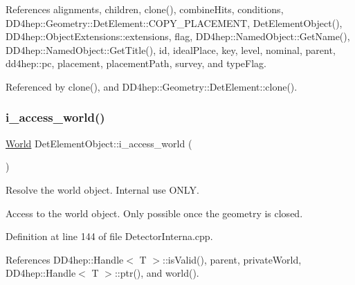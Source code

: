 References alignments, children, clone(), combine\+Hits, conditions, D\+D4hep\+::\+Geometry\+::\+Det\+Element\+::\+C\+O\+P\+Y\+\_\+\+P\+L\+A\+C\+E\+M\+E\+NT, Det\+Element\+Object(), D\+D4hep\+::\+Object\+Extensions\+::extensions, flag, D\+D4hep\+::\+Named\+Object\+::\+Get\+Name(), D\+D4hep\+::\+Named\+Object\+::\+Get\+Title(), id, ideal\+Place, key, level, nominal, parent, dd4hep\+::pc, placement, placement\+Path, survey, and type\+Flag.



Referenced by clone(), and D\+D4hep\+::\+Geometry\+::\+Det\+Element\+::clone().

\hypertarget{class_d_d4hep_1_1_geometry_1_1_det_element_object_af8e12445511be14deaedd157bd8ddbd6}{}\label{class_d_d4hep_1_1_geometry_1_1_det_element_object_af8e12445511be14deaedd157bd8ddbd6} 
\subsubsection{\texorpdfstring{i\+\_\+access\+\_\+world()}{i\_access\_world()}}
{\footnotesize\ttfamily \hyperlink{class_d_d4hep_1_1_geometry_1_1_world}{World} Det\+Element\+Object\+::i\+\_\+access\+\_\+world (\begin{DoxyParamCaption}{ }\end{DoxyParamCaption})\hspace{0.3cm}{\ttfamily [private]}}



Resolve the world object. Internal use O\+N\+LY. 

Access to the world object. Only possible once the geometry is closed. 

Definition at line 144 of file Detector\+Interna.\+cpp.



References D\+D4hep\+::\+Handle$<$ T $>$\+::is\+Valid(), parent, private\+World, D\+D4hep\+::\+Handle$<$ T $>$\+::ptr(), and world().

\hypertarget{class_d_d4hep_1_1_geometry_1_1_det_element_object_a9db522499c3fbe2f11ae195cfd4f5e03}{}\label{class_d_d4hep_1_1_geometry_1_1_det_element_object_a9db522499c3fbe2f11ae195cfd4f5e03} 
